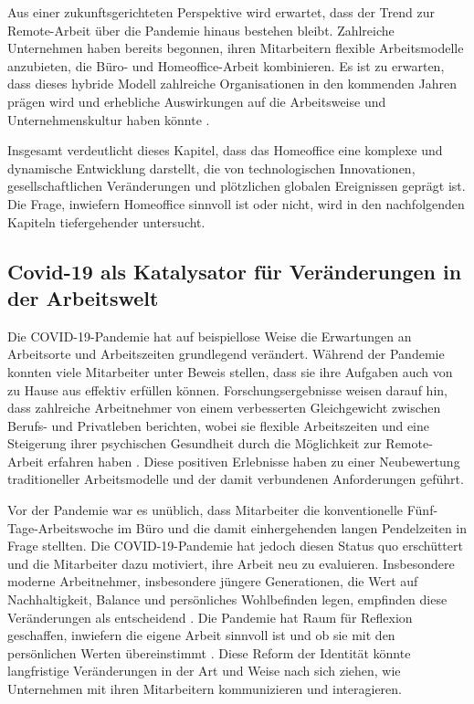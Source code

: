 Aus einer zukunftsgerichteten Perspektive wird erwartet, dass der Trend zur Remote-Arbeit über die Pandemie hinaus bestehen bleibt. Zahlreiche Unternehmen haben bereits begonnen, ihren Mitarbeitern flexible Arbeitsmodelle anzubieten, die Büro- und Homeoffice-Arbeit kombinieren. Es ist zu erwarten, dass dieses hybride Modell zahlreiche Organisationen in den kommenden Jahren prägen wird und erhebliche Auswirkungen auf die Arbeitsweise und Unternehmenskultur haben könnte \cite{7}.

Insgesamt verdeutlicht dieses Kapitel, dass das Homeoffice eine komplexe und dynamische Entwicklung darstellt, die von technologischen Innovationen, gesellschaftlichen Veränderungen und plötzlichen globalen Ereignissen geprägt ist. Die Frage, inwiefern Homeoffice sinnvoll ist oder nicht, wird in den nachfolgenden Kapiteln tiefergehender untersucht.

\subsection{Covid-19 als Katalysator für Veränderungen in der Arbeitswelt}

Die COVID-19-Pandemie hat auf beispiellose Weise die Erwartungen an Arbeitsorte und Arbeitszeiten grundlegend verändert. Während der Pandemie konnten viele Mitarbeiter unter Beweis stellen, dass sie ihre Aufgaben auch von zu Hause aus effektiv erfüllen können. Forschungsergebnisse weisen darauf hin, dass zahlreiche Arbeitnehmer von einem verbesserten Gleichgewicht zwischen Berufs- und Privatleben berichten, wobei sie flexible Arbeitszeiten und eine Steigerung ihrer psychischen Gesundheit durch die Möglichkeit zur Remote-Arbeit erfahren haben \cite{file2}. Diese positiven Erlebnisse haben zu einer Neubewertung traditioneller Arbeitsmodelle und der damit verbundenen Anforderungen geführt.

Vor der Pandemie war es unüblich, dass Mitarbeiter die konventionelle Fünf-Tage-Arbeitswoche im Büro und die damit einhergehenden langen Pendelzeiten in Frage stellten. Die COVID-19-Pandemie hat jedoch diesen Status quo erschüttert und die Mitarbeiter dazu motiviert, ihre Arbeit neu zu evaluieren. Insbesondere moderne Arbeitnehmer, insbesondere jüngere Generationen, die Wert auf Nachhaltigkeit, Balance und persönliches Wohlbefinden legen, empfinden diese Veränderungen als entscheidend \cite{file2}. Die Pandemie hat Raum für Reflexion geschaffen, inwiefern die eigene Arbeit sinnvoll ist und ob sie mit den persönlichen Werten übereinstimmt \cite{file2}. Diese Reform der Identität könnte langfristige Veränderungen in der Art und Weise nach sich ziehen, wie Unternehmen mit ihren Mitarbeitern kommunizieren und interagieren.

